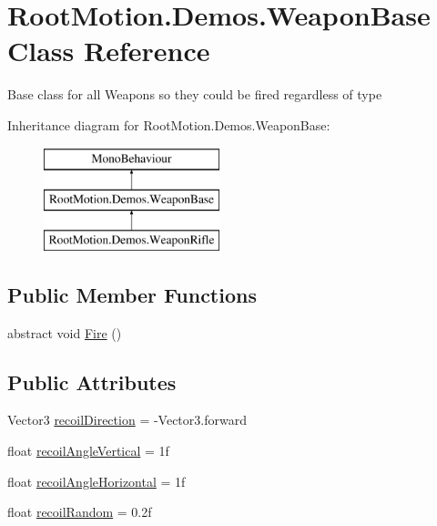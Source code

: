 \hypertarget{class_root_motion_1_1_demos_1_1_weapon_base}{}\section{Root\+Motion.\+Demos.\+Weapon\+Base Class Reference}
\label{class_root_motion_1_1_demos_1_1_weapon_base}


Base class for all Weapons so they could be fired regardless of type  


Inheritance diagram for Root\+Motion.\+Demos.\+Weapon\+Base\+:\begin{figure}[H]
\begin{center}
\leavevmode
\includegraphics[height=3.000000cm]{class_root_motion_1_1_demos_1_1_weapon_base}
\end{center}
\end{figure}
\subsection*{Public Member Functions}
\begin{DoxyCompactItemize}
\item 
abstract void \mbox{\hyperlink{class_root_motion_1_1_demos_1_1_weapon_base_ae0c2eda9d6c7f249bc08d670fb9dd7ff}{Fire}} ()
\end{DoxyCompactItemize}
\subsection*{Public Attributes}
\begin{DoxyCompactItemize}
\item 
Vector3 \mbox{\hyperlink{class_root_motion_1_1_demos_1_1_weapon_base_a26aa17053a7f5a8373b6ac4c0592bdfe}{recoil\+Direction}} = -\/Vector3.\+forward
\item 
float \mbox{\hyperlink{class_root_motion_1_1_demos_1_1_weapon_base_a1c14d851b1c4d00056867e21fcbcd3c7}{recoil\+Angle\+Vertical}} = 1f
\item 
float \mbox{\hyperlink{class_root_motion_1_1_demos_1_1_weapon_base_ab1ec81cb984557cbc299684a71d72fd9}{recoil\+Angle\+Horizontal}} = 1f
\item 
float \mbox{\hyperlink{class_root_motion_1_1_demos_1_1_weapon_base_a9eddded7a094a8fbf9acdd342ea72053}{recoil\+Random}} = 0.\+2f
\end{DoxyCompactItemize}


